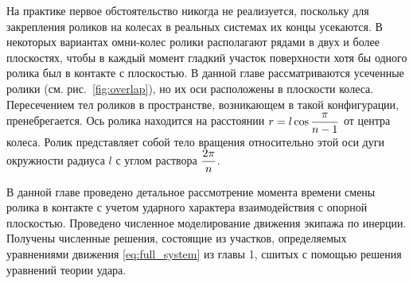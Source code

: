 На практике первое обстоятельство никогда не реализуется, поскольку для закрепления роликов на колесах в реальных системах их концы усекаются. В некоторых вариантах омни-колес ролики располагают рядами в двух и более плоскостях, чтобы в каждый момент гладкий участок поверхности хотя бы одного ролика был в контакте с плоскостью. В данной главе рассматриваются усеченные ролики (см. рис.~\ref{fig:overlap}), но их оси расположены в плоскости колеса. Пересечением тел роликов в пространстве, возникающем в такой конфигурации, пренебрегается. Ось ролика находится на расстоянии $r = l\cos\displaystyle\frac{\displaystyle \pi}{\displaystyle n-1}$ от центра колеса. Ролик представляет собой тело вращения относительно этой оси дуги окружности радиуса $l$ с углом раствора $\displaystyle\frac{\displaystyle 2\pi}{\displaystyle n}$.

В данной главе проведено детальное рассмотрение момента времени смены ролика в контакте с учетом ударного характера взаимодействия с опорной плоскостью. Проведено численное моделирование движения экипажа по инерции. Получены численные решения, состоящие из участков, определяемых уравнениями движения \ref{eq:full_system} из главы 1, сшитых с помощью решения уравнений теории удара.

